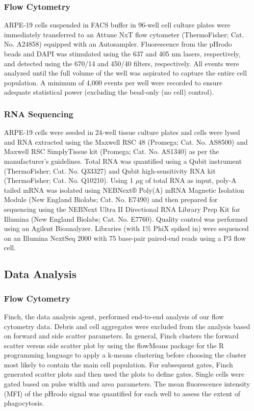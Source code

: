 \documentclass{article}
\begin{document}
\subsubsection{Flow Cytometry}

ARPE-19 cells suspended in FACS buffer in 96-well cell culture plates were immediately transferred to an Attune NxT flow cytometer (ThermoFisher; Cat. No. A24858) equipped with an Autosampler. Fluorescence from the pHrodo beads and DAPI was stimulated using the 637 and 405 nm lasers, respectively, and detected using the 670/14 and 450/40 filters, respectively. All events were analyzed until the full volume of the well was aspirated to capture the entire cell population. A minimum of 4,000 events per well were recorded to ensure adequate statistical power (excluding the bead-only (no cell) control).

\subsubsection{RNA Sequencing}

ARPE-19 cells were seeded in 24-well tissue culture plates and cells were lysed and RNA extracted using the Maxwell RSC 48 (Promega; Cat. No. AS8500) and Maxwell RSC SimplyTissue kit (Promega; Cat. No. AS1340) as per the manufacturer’s guidelines. Total RNA was quantified using a Qubit instrument (ThermoFisher; Cat. No. Q33327) and Qubit high-sensitivity RNA kit (ThermoFisher; Cat. No. Q10210). Using 1 $\mu$g of total RNA as input, poly-A tailed mRNA was isolated using NEBNext® Poly(A) mRNA Magnetic Isolation Module (New England Biolabs; Cat. No. E7490) and then prepared for sequencing using the NEBNext Ultra II Directional RNA Library Prep Kit for Illumina (New England Biolabs; Cat. No. E7760). Quality control was performed using an Agilent Bioanalyzer. Libraries (with 1\% PhiX spiked in) were sequenced on an Illumina NextSeq 2000 with 75 base-pair paired-end reads using a P3 flow cell. 

\subsection{Data Analysis}

\subsubsection{Flow Cytometry}

Finch, the data analysis agent, performed end-to-end analysis of our flow cytometry data. Debris and cell aggregates were excluded from the analysis based on forward and side scatter parameters. In general, Finch clusters the forward scatter versus side scatter plot by using the flowMeans package for the R programming language to apply a k-means clustering before choosing the cluster most likely to contain the main cell population. For subsequent gates, Finch generated scatter plots and then used the plots to define gates. Single cells were gated based on pulse width and area parameters. The mean fluorescence intensity (MFI) of the pHrodo signal was quantified for each well to assess the extent of phagocytosis. 
\end{document}
